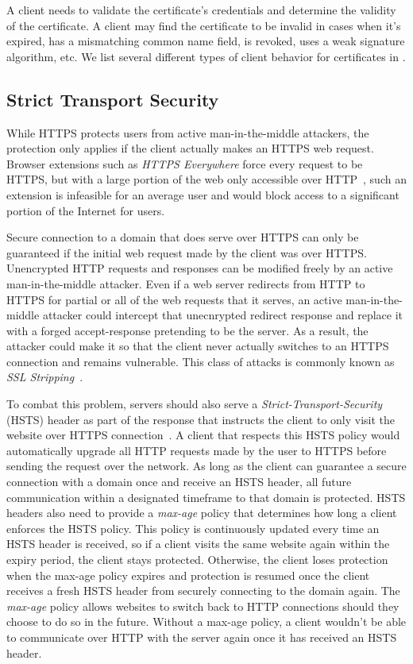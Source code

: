 A client needs to validate the certificate's credentials and determine the
validity of the certificate. A client may find the certificate to be invalid in
cases when it's expired, has a mismatching common name field, is revoked, uses a
weak signature algorithm, etc. We list several different types of client
behavior for certificates in .

\subsection{Strict Transport Security}
While HTTPS protects users from active man-in-the-middle attackers, the
protection only applies if the client actually makes an HTTPS web request.
Browser extensions such as \emph{HTTPS Everywhere} force every request to be
HTTPS, but with a large portion of the web only accessible over
HTTP~\cite{https-ecosystem}, such an extension is infeasible for an average
user and would block access to a significant portion of the Internet for users.

Secure connection to a domain that does serve over HTTPS can only be guaranteed
if the initial web request made by the client was over HTTPS. Unencrypted HTTP
requests and responses can be modified freely by an active man-in-the-middle
attacker. Even if a web server redirects from HTTP to HTTPS for partial or all
of the web requests that it serves, an active man-in-the-middle attacker could
intercept that unecnrypted redirect response and replace it with a forged
accept-response pretending to be the server. As a result, the attacker could
make it so that the client never actually switches to an HTTPS connection and
remains vulnerable. This class of attacks is commonly known as \emph{SSL
Stripping}~\cite{sslstrip}.

To combat this problem, servers should also serve a
\emph{Strict-Transport-Security} (HSTS) header as part of the response that
instructs the client to only visit the website over HTTPS
connection~\cite{RFC6797}. A client that respects this HSTS policy would
automatically upgrade all HTTP requests made by the user to HTTPS before
sending the request over the network. As long as the client can guarantee a
secure connection with a domain once and receive an HSTS header, all future
communication within a designated timeframe to that domain is protected. HSTS
headers also need to provide a \emph{max-age} policy that determines how long a
client enforces the HSTS policy. This policy is continuously updated every time
an HSTS header is received, so if a client visits the same website again within
the expiry period, the client stays protected. Otherwise, the client loses
protection when the max-age policy expires and protection is resumed once the
client receives a fresh HSTS header from securely connecting to the domain
again. The \emph{max-age} policy allows websites to switch back to HTTP
connections should they choose to do so in the future. Without a max-age
policy, a client wouldn't be able to communicate over HTTP with the server
again once it has received an HSTS header.

